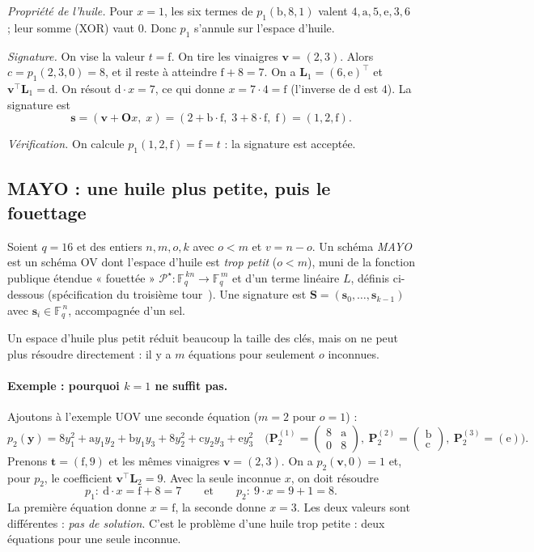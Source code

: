 \emph{Propriété de l'huile.} Pour $x=1$, les six termes de $p_1(\mathrm{b},8,1)$ valent $4,\mathrm{a},5,\mathrm{e},3,6$ ; leur somme (XOR) vaut $0$. Donc $p_1$ s'annule sur l'espace d'huile.

\emph{Signature.} On vise la valeur $t=\mathrm{f}$. On tire les vinaigres $\mathbf{v}=(2,3)$. Alors $c=p_1(2,3,0)=8$, et il reste à atteindre $\mathrm{f}+8=7$. On a $\mathbf{L}_1=(6,\mathrm{e})^{\top}$ et $\mathbf{v}^{\top}\mathbf{L}_1=\mathrm{d}$. On résout $\mathrm{d}\cdot x=7$, ce qui donne $x=7\cdot4=\mathrm{f}$ (l'inverse de $\mathrm{d}$ est $4$). La signature est
\[\mathbf{s}=(\mathbf{v}+\mathbf{O}x,\;x)=(2+\mathrm{b}\cdot\mathrm{f},\;3+8\cdot\mathrm{f},\;\mathrm{f})=(1,2,\mathrm{f}).\]

\emph{Vérification.} On calcule $p_1(1,2,\mathrm{f})=\mathrm{f}=t$ : la signature est acceptée.

\subsection{MAYO : une huile plus petite, puis le fouettage}
\begin{definition}
Soient $q=16$ et des entiers $n,m,o,k$ avec $o<m$ et $v=n-o$. Un schéma \emph{MAYO} est un schéma OV dont l'espace d'huile est \emph{trop petit} ($o<m$), muni de la fonction publique étendue « fouettée » $\mathcal{P}^\star:\mathbb{F}_q^{\,kn}\to\mathbb{F}_q^{\,m}$ et d'un terme linéaire $L$, définis ci-dessous (spécification du troisième tour~\cite{mayospec}). Une signature est $\mathbf{S}=(\mathbf{s}_0,\dots,\mathbf{s}_{k-1})$ avec $\mathbf{s}_i\in\mathbb{F}_q^{\,n}$, accompagnée d'un sel.
\end{definition}
Un espace d'huile plus petit réduit beaucoup la taille des clés, mais on ne peut plus résoudre directement : il y a $m$ équations pour seulement $o$ inconnues.

\paragraph{Exemple : pourquoi $k=1$ ne suffit pas.} Ajoutons à l'exemple UOV une seconde équation ($m=2$ pour $o=1$) :
\[p_2(\mathbf{y})=8y_1^2+\mathrm{a}y_1y_2+\mathrm{b}y_1y_3+8y_2^2+\mathrm{c}y_2y_3+\mathrm{e}y_3^2\quad\bigl(\mathbf{P}^{(1)}_2=\begin{pmatrix}8&\mathrm{a}\\0&8\end{pmatrix},\ \mathbf{P}^{(2)}_2=\begin{pmatrix}\mathrm{b}\\\mathrm{c}\end{pmatrix},\ \mathbf{P}^{(3)}_2=(\mathrm{e})\bigr).\]
Prenons $\mathbf{t}=(\mathrm{f},9)$ et les mêmes vinaigres $\mathbf{v}=(2,3)$. On a $p_2(\mathbf{v},0)=1$ et, pour $p_2$, le coefficient $\mathbf{v}^{\top}\mathbf{L}_2=9$. Avec la seule inconnue $x$, on doit résoudre
\[p_1:\ \mathrm{d}\cdot x=\mathrm{f}+8=7\qquad\text{et}\qquad p_2:\ 9\cdot x=9+1=8.\]
La première équation donne $x=\mathrm{f}$, la seconde donne $x=3$. Les deux valeurs sont différentes : \emph{pas de solution}. C'est le problème d'une huile trop petite : deux équations pour une seule inconnue.

